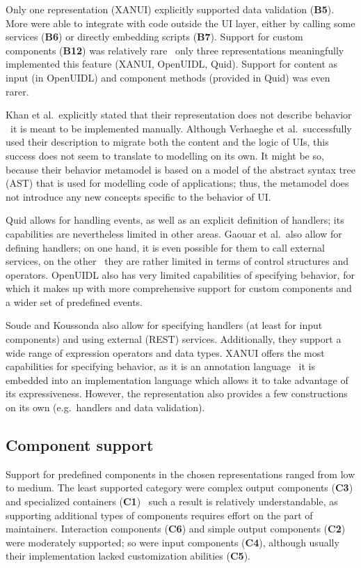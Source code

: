 Only one representation (XANUI) explicitly supported data validation (\textbf{B5}).
More were able to integrate with code outside the UI layer, either by calling some services (\textbf{B6}) or directly embedding scripts (\textbf{B7}).
Support for custom components (\textbf{B12}) was relatively rare \textendash\ only three representations meaningfully implemented this feature (XANUI, OpenUIDL, Quid).
Support for content as input (in OpenUIDL) and component methods (provided in Quid) was even rarer.

Khan et al.\ explicitly stated that their representation does not describe behavior \textendash\ it is meant to be implemented manually.
Although Verhaeghe et al.\ successfully used their description to migrate both the content and the logic of UIs, this success does not seem to translate to modelling on its own.
It might be so, because their behavior metamodel is based on a model of the abstract syntax tree (AST) that is used for modelling code of applications;
thus, the metamodel does not introduce any new concepts specific to the behavior of UI\@.

Quid allows for handling events, as well as an explicit definition of handlers; its capabilities are nevertheless limited in other areas.
Gaouar et al.\ also allow for defining handlers; on one hand, it is even possible for them to call external services, on the other \textendash\ they are rather limited in terms of control structures and operators.
OpenUIDL also has very limited capabilities of specifying behavior, for which it makes up with more comprehensive support for custom components and a wider set of predefined events.

Soude and Koussonda also allow for specifying handlers (at least for input components) and using external (REST) services.
Additionally, they support a wide range of expression operators and data types.
XANUI offers the most capabilities for specifying behavior, as it is an annotation language \textendash\ it is embedded into an implementation language which allows it to take advantage of its expressiveness.
However, the representation also provides a few constructions on its own (e.g.\ handlers and data validation).

\subsection{Component support}\label{subsec:4-2-component-support}
Support for predefined components in the chosen representations ranged from low to medium.
The least supported category were complex output components (\textbf{C3}) and specialized containers (\textbf{C1}) \textendash\ such a result is relatively understandable, as supporting additional types of components requires effort on the part of maintainers.
Interaction components (\textbf{C6}) and simple output components (\textbf{C2}) were moderately supported;
so were input components (\textbf{C4}), although usually their implementation lacked customization abilities (\textbf{C5}).

